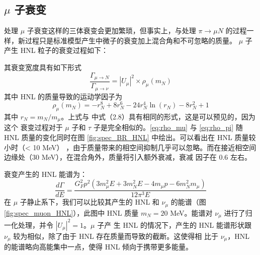 \documentclass[printMode=false, declarePage=false]{ecnuthesis}
\begin{document}
\subsection{$\mu$ 子衰变}
处理 $\mu$ 子衰变这样的三体衰变会更加繁琐，但事实上，与处理 $\pi \to \mu N$ 的过程一样，新过程只是标准模型产生中微子的衰变加上混合角和不可忽略的质量。
$\mu$ 子产生 HNL 粒子的衰变过程如下：
\begin{center}
\end{center}
其衰变宽度具有如下形式
\begin{equation}
  \frac{\Gamma_{\mu \to N}}{\Gamma_{\mu \to \nu}} = |U_{\mu}|^2 \times \rho_\mu(m_N)
\end{equation}
其中 HNL 的质量导致的运动学因子为
\begin{equation}
  \rho_\mu(m_N) = - r_N^8 + 8 r_N^6 - 24 r_N^4 \ln(r_N) - 8 r_N^2 + 1 \label{eq:rho_mu}
\end{equation}
其中 $r_N = m_N / m_\mu$。上式与 \cite{Bondarenko_2018} 中式（2.8）具有相同的形式，这是可以预见的，因为这个
衰变过程对于 $\mu$ 子和 $\tau$ 子是完全相似的。\ref{eq:rho_mu} 与 \ref{eq:rho_pi} 随 HNL 质量的变化同时在图
\ref{fig:spec_BR_HNL} 中绘出。可以看出在 HNL 质量较小时（< 10 MeV）
，由于质量带来的相空间抑制几乎可以忽略。而在接近相空间边缘处（30 MeV），在混合角外，质量将引入额外衰减，衰减
因子在 0.6 左右。

衰变产生的 HNL 能谱为：
\begin{equation}
  \frac{d\Gamma}{dE} = \frac{G_F^2 p^2 (3 m_\mu^2 E + 3 m_N^2 E - 4 m_\mu p - 6 m_N^2 m_\mu)}{12 \pi^3 E} \label{eq:mu_HNL_spec}
\end{equation}
在 $\mu$ 子静止系下，我们可以比较其产生的 HNL 和 $\nu_\mu$ 的能谱（图\ref{fig:spec_muon_HNL}），此图中 HNL 质量
$m_N = 20$ MeV。能谱对 $\nu_\mu$ 进行了归一化处理，并令 $|U_{\mu}|^2 = 1$。$\mu$ 子产
生 HNL 的情况下，产生的 HNL 能谱形状跟 $\nu_\mu$ 较为相似，除了由于 HNL 存在质量而导致的截断。这使得相
比于 $\nu_\mu$，HNL 的能谱略向高能集中一点，使得 HNL 倾向于携带更多能量。
\end{document}
